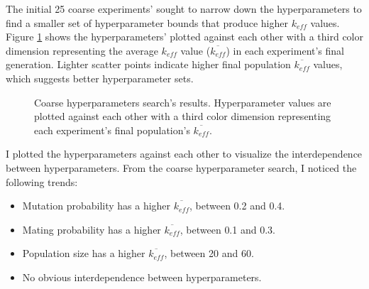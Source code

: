 The initial 25 coarse experiments' sought to narrow down the hyperparameters 
to find a smaller set of hyperparameter bounds that produce higher $k_{eff}$ values.
Figure \ref{fig:hyperparameter_sens} shows the hyperparameters' plotted against 
each other with a third color dimension representing the average $k_{eff}$ value
($\overline{k_{eff}}$) in each experiment's final generation. 
Lighter scatter points indicate higher final population $\overline{k_{eff}}$ values, 
which suggests better hyperparameter sets. 
\begin{figure}[]
    \centering
    \caption{Coarse hyperparameters search's results. Hyperparameter values are plotted 
    against each other with a third color dimension representing each experiment's 
    final population's $\overline{k_{eff}}$.}
    \label{fig:hyperparameter_sens}
\end{figure}
I plotted the hyperparameters against each other to visualize the interdependence 
between hyperparameters. 
From the coarse hyperparameter search, I noticed the following trends: 
\begin{itemize}
    \item Mutation probability has a higher $\overline{k_{eff}}$, between 0.2 and 0.4. 
    \item Mating probability has a higher $\overline{k_{eff}}$, between 0.1 and 0.3. 
    \item Population size has a higher $\overline{k_{eff}}$, between 20 and 60. 
    \item No obvious interdependence between hyperparameters. 
\end{itemize} 


